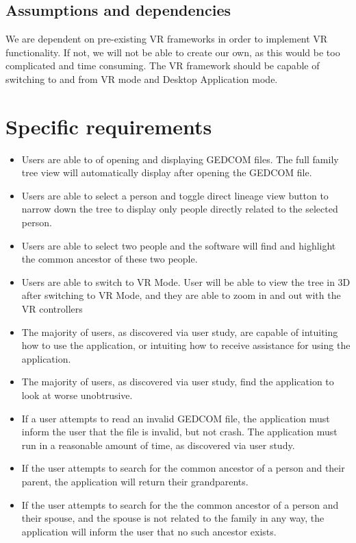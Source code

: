 \documentclass[onecolumn, draftclsnofoot, 10pt, compsoc]{IEEEtran}
\begin{document}
\subsection{Assumptions and dependencies}
\begin{singlespace}
We are dependent on pre-existing VR frameworks in order to implement VR functionality. If not, we will not be able to create our own, as this would be too complicated and time consuming. The VR framework should be capable of switching to and from VR mode and Desktop Application mode.
\end{singlespace}

\section{Specific requirements}
\begin{itemize}
\item Users are able to of opening and displaying GEDCOM files. The full family tree view will automatically display after opening the GEDCOM file.
\item Users are able to select a person and toggle direct lineage view button to narrow down the tree to display only people directly related to the selected person.
\item Users are able to select two people and the software will find and highlight the common ancestor of these two people.
\item Users are able to switch to VR Mode. User will be able to view the tree in 3D after switching to VR Mode, and they are able to zoom in and out with the VR controllers
\item The majority of users, as discovered via user study, are capable of intuiting how to use the application, or intuiting how to receive assistance for using the application.
\item The majority of users, as discovered via user study, find the application to look at worse unobtrusive.
\item If a user attempts to read an invalid GEDCOM file, the application must inform the user that the file is invalid, but not crash.
The application must run in a reasonable amount of time, as discovered via user study.
\item If the user attempts to search for the common ancestor of a person and their parent, the application will return their grandparents.
\item If the user attempts to search for the the common ancestor of a person and their spouse, and the spouse is not related to the family in any way, the application will inform the user that no such ancestor exists.
\end{itemize}
\end{document}
